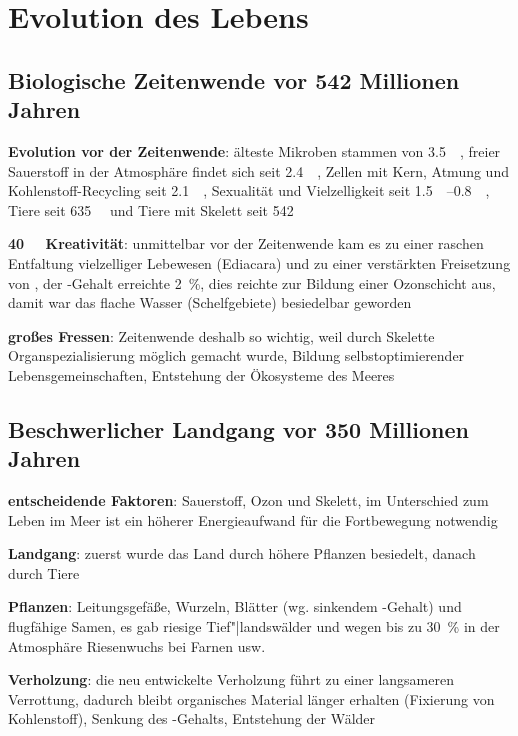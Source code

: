 \chapter{%
    Evolution des Lebens%
}

\section{%
    Biologische Zeitenwende vor 542 Millionen Jahren
}

\textbf{Evolution vor der Zeitenwende}:
älteste Mikroben stammen von \SI{3.5}{\giga\year},
freier Sauerstoff in der Atmosphäre findet sich seit \SI{2.4}{\giga\year},
Zellen mit Kern, Atmung und Kohlenstoff-Recycling seit \SI{2.1}{\giga\year},
Sexualität und Vielzelligkeit seit \SIrange{1.5}{0.8}{\giga\year},
Tiere seit \SI{635}{\mega\year} und
Tiere mit Skelett seit \SI{542}{\mega\year}

\textbf{\SI{40}{\mega\year} Kreativität}:
unmittelbar vor der Zeitenwende kam es zu einer raschen Entfaltung vielzelliger
Lebewesen (Ediacara) und zu einer verstärkten Freisetzung von ,
der -Gehalt erreichte \SI{2}{\percent}, dies reichte zur Bildung einer Ozonschicht aus,
damit war das flache Wasser (Schelfgebiete) besiedelbar geworden

\textbf{großes Fressen}:
Zeitenwende deshalb so wichtig, weil durch Skelette Organspezialisierung möglich gemacht wurde,
Bildung selbstoptimierender Lebensgemeinschaften,
Entstehung der Ökosysteme des Meeres

\section{%
    Beschwerlicher Landgang vor 350 Millionen Jahren%
}

\textbf{entscheidende Faktoren}:
Sauerstoff, Ozon und Skelett,
im Unterschied zum Leben im Meer ist ein höherer Energieaufwand für die Fortbewegung notwendig

\textbf{Landgang}:
zuerst wurde das Land durch höhere Pflanzen besiedelt, danach durch Tiere

\textbf{Pflanzen}:
Leitungsgefäße, Wurzeln, Blätter (wg. sinkendem -Gehalt)
und flugfähige Samen,
es gab riesige Tief"|landswälder und wegen bis zu \SI{30}{\percent}  in der Atmosphäre
Riesenwuchs bei Farnen usw.

\textbf{Verholzung}:
die neu entwickelte Verholzung führt zu einer langsameren Verrottung,
dadurch bleibt organisches Material länger erhalten (Fixierung von Kohlenstoff),
Senkung des -Gehalts,
Entstehung der Wälder

